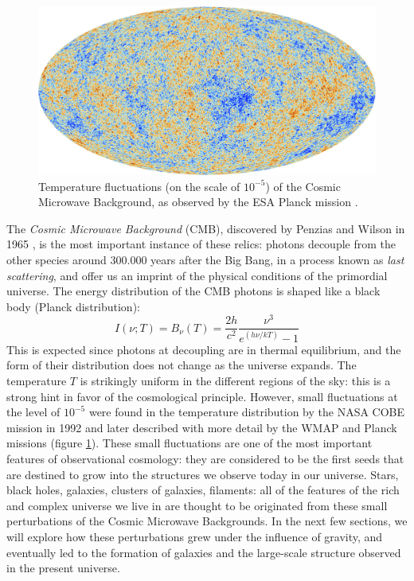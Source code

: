  \begin{figure}
	\centering
	\includegraphics[width=1.\textwidth]{plots/Planck_CMB_pillars.jpg}
	\caption{Temperature fluctuations (on the scale of $10^{-5}$) of the Cosmic Microwave Background, as observed by the ESA Planck mission \citep{2016planck}.  
	}
	\label{fig:CMB}
\end{figure}


 The \textit{Cosmic Microwave Background} (CMB), discovered by Penzias and Wilson in 1965 \citep{penzias_wilson_cmb}, is the most important instance of these relics: photons decouple from the other species around 300.000 years after the Big Bang, in a process known as \textit{last scattering}, and offer us an imprint of the physical conditions of the primordial universe. The energy distribution of the CMB photons is shaped like a black body (Planck distribution):
 \begin{equation}
     I(\nu;T) = B_\nu(T) =  \frac{2h}{c^2} \frac{\nu^3}{e^{(h\nu/kT)}-1} \label{eq:black_body}
 \end{equation}
 This is expected since photons at decoupling are in thermal equilibrium, and the form of their distribution does not change as the universe expands. The temperature $T$ is strikingly uniform in the different regions of the sky: this is a strong hint in favor of the cosmological principle. However, small fluctuations at the level of $10^{-5}$ were found in the temperature distribution by the NASA COBE mission in 1992 and later described with more detail by the WMAP and Planck missions (figure \ref{fig:CMB}). These small fluctuations are one of the most important features of observational cosmology: they are considered to be the first seeds that are destined to grow into the structures we observe today in our universe. Stars, black holes, galaxies, clusters of galaxies, filaments: all of the features of the rich and complex universe we live in are thought to be originated from these small perturbations of the Cosmic Microwave Backgrounds. In the next few sections, we will explore how these perturbations grew under the influence of gravity, and eventually led to the formation of galaxies and the large-scale structure observed in the present universe.
 
